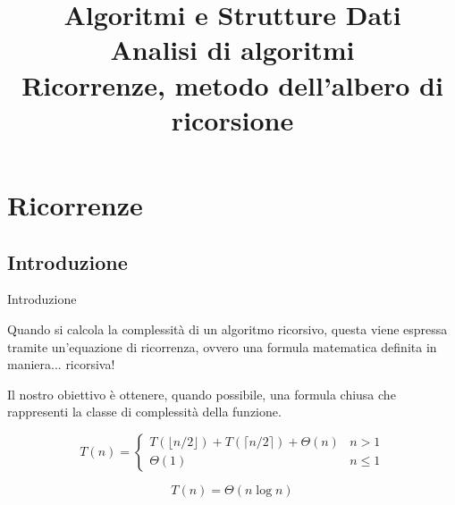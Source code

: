 \title[ASD - Analisi di algoritmi]{\textbf{Algoritmi e Strutture Dati}\\[18pt]Analisi di algoritmi\\Ricorrenze, metodo dell'albero di ricorsione}

\FrameTitle{}


\section{Ricorrenze}

\subsection{Introduzione}

\begin{frame}{Introduzione}

\begin{overprint}

\begin{myboxtitle}
Quando si calcola la complessità di un algoritmo ricorsivo, questa viene espressa tramite un'\alert{equazione di ricorrenza}, ovvero una formula matematica definita in  maniera... ricorsiva!
\end{myboxtitle}

\begin{myboxtitle}
Il nostro obiettivo è ottenere, quando possibile, una \alert{formula chiusa} che rappresenti la classe di complessità della funzione.
\end{myboxtitle}

\end{overprint}

\bigskip
\begin{overprint}
\begin{myboxtitle}[MergeSort]
\[
T(n) = 
  \begin{cases}
      T(\lfloor n/2 \rfloor)  +  T(\lceil n/2 \rceil)  + \Theta(n) & n > 1 \\
     \Theta(1) & n \leq 1
  \end{cases} 
\]	
\end{myboxtitle}

\begin{myboxtitle}[MergeSort]
\[
T(n) = \Theta(n \log n)
\]
\end{myboxtitle}

\end{overprint}

\end{frame}

